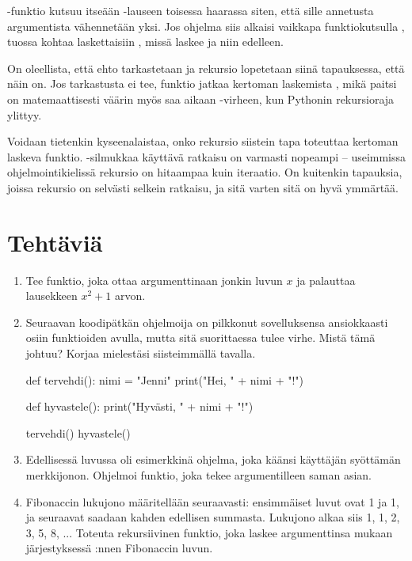 -funktio kutsuu itseään -lauseen toisessa haarassa siten, että sille annetusta argumentista vähennetään yksi. Jos ohjelma siis alkaisi vaikkapa funktiokutsulla , tuossa kohtaa laskettaisiin , missä  laskee  ja niin edelleen.

On oleellista, että ehto  tarkastetaan ja rekursio lopetetaan siinä tapauksessa, että näin on. Jos tarkastusta ei tee, funktio jatkaa kertoman laskemista , mikä paitsi on matemaattisesti väärin myös saa aikaan -virheen, kun Pythonin rekursioraja ylittyy.

Voidaan tietenkin kyseenalaistaa, onko rekursio siistein tapa toteuttaa kertoman laskeva funktio. -silmukkaa käyttävä ratkaisu on varmasti nopeampi -- useimmissa ohjelmointikielissä rekursio on hitaampaa kuin iteraatio. On kuitenkin tapauksia, joissa rekursio on selvästi selkein ratkaisu, ja sitä varten sitä on hyvä ymmärtää.

\section{Tehtäviä}

\begin{enumerate}[\thesection .1]

\item Tee funktio, joka ottaa argumenttinaan jonkin luvun $x$ ja palauttaa lausekkeen $x^2 + 1$ arvon.

\item Seuraavan koodipätkän ohjelmoija on pilkkonut sovelluksensa ansiokkaasti osiin funktioiden avulla, mutta sitä suorittaessa tulee virhe. Mistä tämä johtuu? Korjaa mielestäsi siisteimmällä tavalla.

\begin{python}
def tervehdi():
        nimi = "Jenni"
        print("Hei, " + nimi + "!")

def hyvastele():
        print("Hyvästi, " + nimi + "!")

tervehdi()
hyvastele()
\end{python}

\item Edellisessä luvussa oli esimerkkinä ohjelma, joka käänsi käyttäjän syöttämän merkkijonon. Ohjelmoi funktio, joka tekee argumentilleen saman asian.

\item Fibonaccin lukujono määritellään seuraavasti: ensimmäiset luvut ovat 1 ja 1, ja seuraavat saadaan kahden edellisen summasta. Lukujono alkaa siis 1, 1, 2, 3, 5, 8, ... Toteuta rekursiivinen funktio, joka laskee argumenttinsa  mukaan järjestyksessä :nnen Fibonaccin luvun.

\end{enumerate}
